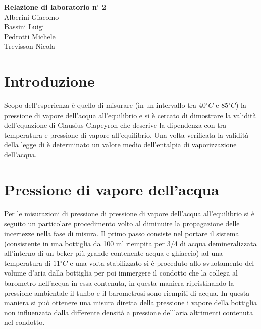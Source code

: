 \documentclass[a4paper,11pt]{article}
\begin{document}
\begin{center}
\textbf{\huge Relazione di laboratorio n\ensuremath{^\circ} 2} \\ \vspace{10pt}
\large Alberini Giacomo \\ Bassini Luigi \\ Pedrotti Michele \\ Trevisson Nicola 
\end{center}

\section{Introduzione}
Scopo dell'esperienza è quello di misurare (in un intervallo tra $40\ensuremath{^\circ}C$ e $85\ensuremath{^\circ}C$) la pressione di vapore dell'acqua all'equilibrio e si è cercato di dimostrare la validità dell'equazione di Clausius-Clapeyron che descrive la dipendenza con tra temperatura e pressione di vapore all'equilibrio.
Una volta verificata la validità della legge di è determinato un valore medio dell'entalpia di vaporizzazione dell'acqua.

\section{Pressione di vapore dell'acqua}

Per le misurazioni di pressione di pressione di vapore dell'acqua all'equilibrio si è seguito un particolare procedimento volto al diminuire la propagazione delle incertezze nella fase di misura.
Il primo passo consiste nel portare il sistema (consistente in una bottiglia da 100 ml riempita per 3/4 di acqua demineralizzata all'interno di un beker più grande contenente acqua e ghiaccio) ad una temperatura di $11\ensuremath{^\circ}C$ e una volta stabilizzato si è proceduto allo svuotamento del volume d'aria dalla bottiglia per poi immergere il condotto che la collega al barometro nell'acqua in essa contenuta, in questa maniera ripristinando la pressione ambientale il tunbo e il barometrosi sono riempiti di acqua. In questa maniera si può ottenere una misura diretta della pressione i vapore della bottiglia non influenzata dalla differente densità a pressione dell'aria altrimenti contenuta nel condotto.
 
\end{document}
